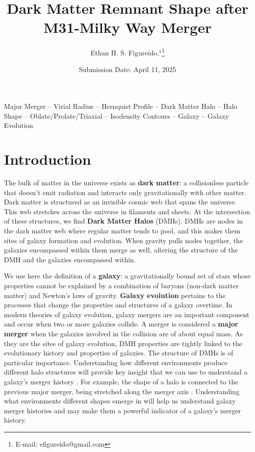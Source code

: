 \documentclass[fleqn,usenatbib]{mnras}
\title[Dark Matter Remnant Shape]{Dark Matter Remnant Shape after M31-Milky Way Merger}
\author[E. H. S. Figureido]{
Ethan H. S. Figureido,$^{1}$\thanks{E-mail: efigureido@gmail.com}}
\date{Submission Date: April 11, 2025}
\begin{document}
\label{firstpage}
\pagerange{\pageref{firstpage}--\pageref{lastpage}}
\maketitle


\begin{keywords}
Major Merger -- Virial Radius -- Hernquist Profile -- Dark Matter Halo -- Halo Shape -- Oblate/Prolate/Triaxial -- Isodensity Contours -- Galaxy -- Galaxy Evolution 
\end{keywords}



\section{Introduction}

The bulk of matter in the universe exists as \textbf{dark matter}: a collisionless particle that doesn’t emit radiation and interacts only gravitationally with other matter. Dark matter is structured as an invisible cosmic web that spans the universe. This web stretches across the universe in filaments and sheets. At the intersection of these structures, we find \textbf{Dark Matter Halos} (DMHs). DMHs are nodes in the dark matter web where regular matter tends to pool, and this makes them sites of galaxy formation and evolution. When gravity pulls nodes together, the galaxies encompassed within them merge as well, altering the structure of the DMH and the galaxies encompassed within.

We use here the \citet{Willman_2012} definition of a \textbf{galaxy}: a gravitationally bound set of stars whose properties cannot be explained by a combination of baryons (non-dark matter matter) and Newton’s laws of gravity. \textbf{Galaxy evolution} pertains to the processes that change the properties and structures of a galaxy overtime. In modern theories of galaxy evolution, galaxy mergers are an important component and occur when two or more galaxies collide. A merger is considered a \textbf{major merger} when the galaxies involved in the collision are of about equal mass. As they are the sites of galaxy evolution, DMH properties are tightly linked to the evolutionary history and properties of galaxies. The structure of DMHs is of particular importance. Understanding how different environments produce different halo structures will provide key insight that we can use to understand a galaxy’s merger history \citep{Drakos_2019}. For example, the shape of a halo is connected to the previous major merger, being stretched along the merger axis \citep{Despali_2016}. Understanding what environments different shapes emerge in will help us understand galaxy merger histories and may make them a powerful indicator of a galaxy's merger history.
\end{document}
